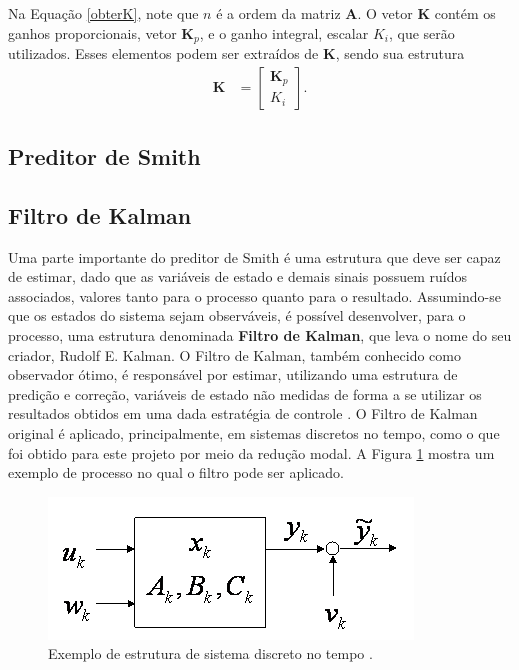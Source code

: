 Na Equação \ref{obterK}, note que $n$ é a ordem da matriz $\mathbf{A}$. O vetor $\mathbf{K}$ contém os ganhos proporcionais, vetor $\mathbf{K}_p$, e o ganho integral, escalar $K_i$, que serão utilizados. Esses elementos podem ser extraídos de $\mathbf{K}$, sendo sua estrutura \begin{align}
	\mathbf{K} & = \left[\begin{array}{c}\mathbf{K}_p\\ K_i\end{array}\right].
\end{align}

\subsection{Preditor de Smith}

\subsection{Filtro de Kalman}
Uma parte importante do preditor de Smith é uma estrutura que deve ser capaz de estimar, dado que as variáveis de estado e demais sinais possuem ruídos associados, valores tanto para o processo quanto para o resultado. Assumindo-se que os estados do sistema sejam observáveis, é possível desenvolver, para o processo, uma estrutura denominada \textbf{Filtro de Kalman}, que leva o nome do seu criador, Rudolf E. Kalman.
O Filtro de Kalman, também conhecido como observador ótimo, é responsável por estimar, utilizando uma estrutura de predição e correção, variáveis de estado não medidas de forma a se utilizar os resultados obtidos em uma dada estratégia de controle \cite{GoddardKalman}. O Filtro de Kalman original é aplicado, principalmente, em sistemas discretos no tempo, como o que foi obtido para este projeto por meio da redução modal. A Figura \ref{Kalman1} mostra um exemplo de processo no qual o filtro pode ser aplicado.
\begin{figure}[!ht]
\centering
\caption{Exemplo de estrutura de sistema discreto no tempo \cite{GoddardKalman}. \label{Kalman1}}
\includegraphics[width=.7\linewidth]{figs/kalman/kalman1}
\end{figure}

